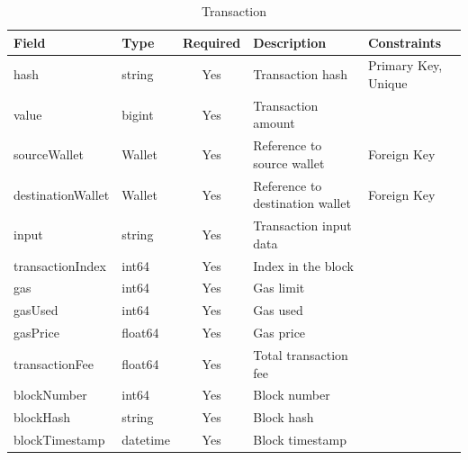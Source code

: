 \begin{table}[htbp]
  \centering
  \caption{Transaction}
  \renewcommand{\arraystretch}{1.5}
  \begin{tabular}{|p{3cm}|p{2cm}|c|p{4cm}|p{4cm}|}
    \hline
    \textbf{Field} & \textbf{Type} & \textbf{Required} & \textbf{Description} & \textbf{Constraints} \\
    \hline
    hash & string & Yes & Transaction hash & Primary Key, Unique \\
    \hline
    value & bigint & Yes & Transaction amount & \\
    \hline
    sourceWallet & Wallet & Yes & Reference to source wallet & Foreign Key \\
    \hline
    destinationWallet & Wallet & Yes & Reference to destination wallet & Foreign Key \\
    \hline
    input & string & Yes & Transaction input data & \\
    \hline
    transactionIndex & int64 & Yes & Index in the block & \\
    \hline
    gas & int64 & Yes & Gas limit & \\
    \hline
    gasUsed & int64 & Yes & Gas used & \\
    \hline
    gasPrice & float64 & Yes & Gas price & \\
    \hline
    transactionFee & float64 & Yes & Total transaction fee & \\
    \hline
    blockNumber & int64 & Yes & Block number & \\
    \hline
    blockHash & string & Yes & Block hash & \\
    \hline
    blockTimestamp & datetime & Yes & Block timestamp & \\
    \hline
  \end{tabular}
\end{table}

